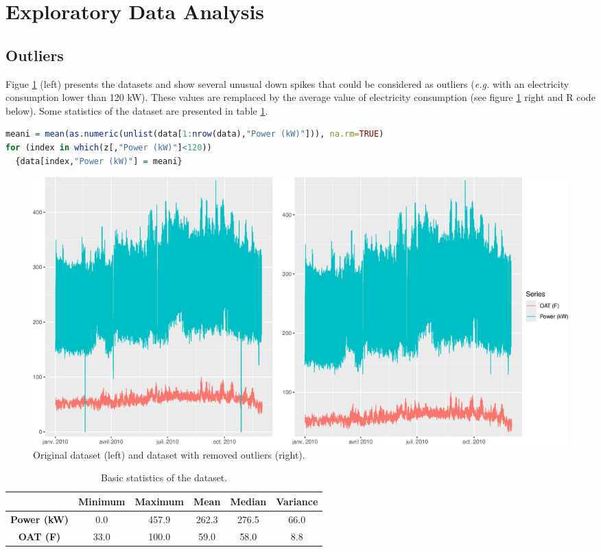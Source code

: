 \section{Exploratory Data Analysis}

\subsection{Outliers}
Figue \ref{figure_dataset} (left) presents the datasets and show several unusual down spikes that 
could be considered as outliers (\textit{e.g.} with an electricity consumption lower than 120 kW). 
These values are remplaced by the average value of electricity consumption (see figure 
\ref{figure_dataset} right and R code below). Some statistics of the dataset are presented in table 
\ref{table_dataset}.


\begin{lstlisting}[language=R]
meani = mean(as.numeric(unlist(data[1:nrow(data),"Power (kW)"])), na.rm=TRUE)
for (index in which(z[,"Power (kW)"]<120))
  {data[index,"Power (kW)"] = meani}
\end{lstlisting} 

\begin{figure}[H]
\centering
 \includegraphics[scale=0.45]{figures/dataset.png}
\caption{Original dataset (left) and dataset with removed outliers (right).}
\label{figure_dataset}
\end{figure}

\begin{table}[H]
\centering \begin{tabular}{c|ccccc}
 & \textbf{Minimum} & \textbf{Maximum} & \textbf{Mean} & \textbf{Median} & \textbf{Variance} \\ \hline
\textbf{Power (kW)} &  0.0 & 457.9 & 262.3 & 276.5 & 66.0 \\
\textbf{OAT (F)}    & 33.0 & 100.0 &  59.0 &  58.0 & 8.8 \\
\end{tabular}
\caption{Basic statistics of the dataset.}
\label{table_dataset}
\end{table}


